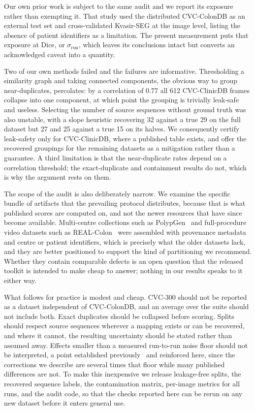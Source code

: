 \documentclass[11pt]{article}
\begin{document}
Our own prior work is subject to the same audit and we report its exposure
rather than exempting it. That study used the distributed CVC-ColonDB as an
external test set and cross-validated Kvasir-SEG at the image level, listing
the absence of patient identifiers as a limitation. The present measurement
puts that exposure at \InflationKvasir{} Dice, or
\InflationKvasirSigma$\sigma_{\mathrm{run}}$, which leaves its conclusions
intact but converts an acknowledged caveat into a quantity.

Two of our own methods failed and the failures are informative. Thresholding
a similarity graph and taking connected components, the obvious way to group
near-duplicates, percolates: by a correlation of 0.77 all 612 CVC-ClinicDB
frames collapse into one component, at which point the grouping is trivially
leak-safe and useless. Selecting the number of source sequences without
ground truth was also unstable, with a slope heuristic recovering 32 against a
true 29 on the full dataset but 27 and 25 against a true 15 on its halves. We
consequently certify leak-safety only for CVC-ClinicDB, where a published
table exists, and offer the recovered groupings for the remaining datasets as
a mitigation rather than a guarantee. A third limitation is that the
near-duplicate rates depend on a correlation threshold; the exact-duplicate
and containment results do not, which is why the argument rests on them.

The scope of the audit is also deliberately narrow. We examine the specific
bundle of artifacts that the prevailing protocol distributes, because that is
what published scores are computed on, and not the newer resources that have
since become available. Multi-centre collections such as
PolypGen~\citep{ali2023polypgen} and full-procedure video datasets such as
REAL-Colon~\citep{biffi2024realcolon} were assembled with provenance metadata
and centre or patient identifiers, which is precisely what the older datasets
lack, and they are better positioned to support the kind of partitioning we
recommend. Whether they contain comparable defects is an open question that
the released toolkit is intended to make cheap to answer; nothing in our
results speaks to it either way.

What follows for practice is modest and cheap. CVC-300 should not be reported
as a dataset independent of CVC-ColonDB, and an average over the suite should
not include both. Exact duplicates should be collapsed before scoring. Splits
should respect source sequences wherever a mapping exists or can be recovered,
and where it cannot, the resulting uncertainty should be stated rather than
assumed away. Effects smaller than a measured run-to-run noise floor should
not be interpreted, a point established previously~\citep{puri2026what} and
reinforced here, since the corrections we describe are several times that
floor while many published differences are not. To make this inexpensive we
release leakage-free splits, the recovered sequence labels, the contamination
matrix, per-image metrics for all \NRuns{} runs, and the audit code, so that
the checks reported here can be rerun on any new dataset before it enters
general use.
\end{document}
